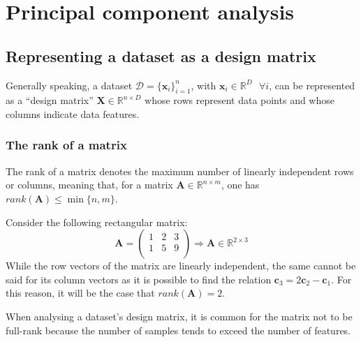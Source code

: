 \documentclass{report}
\begin{document}
\chapter{Principal component analysis}
\section{Representing a dataset as a design matrix}
Generally speaking, a dataset $\displaystyle \mathcal{D} = \{\mathbf{x}_i\}_{i = 1}^n$, with $\displaystyle \mathbf{x}_i \in \mathbb{R}^D \text{ } \forall i$, can be represented as a ``design matrix'' $\displaystyle \mathbf{X} \in \mathbb{R}^{n \times D}$ whose rows represent data points and whose columns indicate data features.
\subsection{The rank of a matrix}
The rank of a matrix denotes the maximum number of linearly independent rows or columns, meaning that, for a matrix $\displaystyle \mathbf{A} \in \mathbb{R}^{n \times m}$, one has $\displaystyle rank(\mathbf{A}) \leq \min\{n, m\}$.
\begin{examplebox}
    Consider the following rectangular matrix:
    \[\mathbf{A} = \begin{pmatrix}
        1 & 2 & 3 \\
        1 & 5 & 9 \\
    \end{pmatrix} \Rightarrow \mathbf{A} \in \mathbb{R}^{2 \times 3}\]
    While the row vectors of the matrix are linearly independent, the same cannot be said for its column vectors as it is possible to find the relation $\displaystyle \mathbf{c}_3 = 2\mathbf{c}_2 - \mathbf{c}_1$. \newline
    For this reason, it will be the case that $\displaystyle rank(\mathbf{A}) = 2$.
\end{examplebox}
\noindent When analysing a dataset's design matrix, it is common for the matrix not to be full-rank because the number of samples tends to exceed the number of features.
\end{document}
